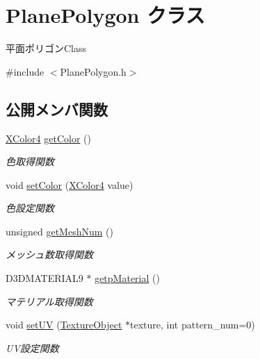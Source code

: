 \hypertarget{class_plane_polygon}{}\section{Plane\+Polygon クラス}
\label{class_plane_polygon}


平面ポリゴン\+Class  




{\ttfamily \#include $<$Plane\+Polygon.\+h$>$}

\subsection*{公開メンバ関数}
\begin{DoxyCompactItemize}
\item 
\mbox{\hyperlink{_vector3_d_8h_a680c30c4a07d86fe763c7e01169cd6cc}{X\+Color4}} \mbox{\hyperlink{class_plane_polygon_a93bf115d1d918f4c6372ae760c19ce6b}{get\+Color}} ()
\begin{DoxyCompactList}\small\item\em 色取得関数 \end{DoxyCompactList}\item 
void \mbox{\hyperlink{class_plane_polygon_adc578914c14b2648455e12d2d3724a07}{set\+Color}} (\mbox{\hyperlink{_vector3_d_8h_a680c30c4a07d86fe763c7e01169cd6cc}{X\+Color4}} value)
\begin{DoxyCompactList}\small\item\em 色設定関数 \end{DoxyCompactList}\item 
unsigned \mbox{\hyperlink{class_plane_polygon_a494068044805bdd4054bc69328c71d7f}{get\+Mesh\+Num}} ()
\begin{DoxyCompactList}\small\item\em メッシュ数取得関数 \end{DoxyCompactList}\item 
D3\+D\+M\+A\+T\+E\+R\+I\+A\+L9 $\ast$ \mbox{\hyperlink{class_plane_polygon_aa475e66d5cbd2c966d47d97dc253ae24}{getp\+Material}} ()
\begin{DoxyCompactList}\small\item\em マテリアル取得関数 \end{DoxyCompactList}\item 
void \mbox{\hyperlink{class_plane_polygon_af2591516a432a77b95932bbb076fad80}{set\+UV}} (\mbox{\hyperlink{class_texture_object}{Texture\+Object}} $\ast$texture, int pattern\+\_\+num=0)
\begin{DoxyCompactList}\small\item\em U\+V設定関数 \end{DoxyCompactList}\item 

\end{DoxyCompactItemize}
